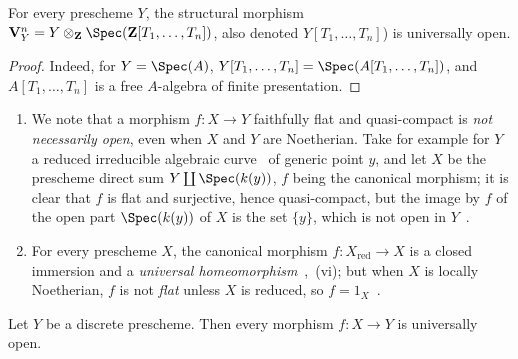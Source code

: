 \begin{corollary}[2.4.7]
\label{IV.2.4.7}
For every prescheme $Y$, the structural morphism $\mathbf{V}_Y^n=Y\otimes_\mathbf{Z}\Spec(\mathbf{Z}[T_1,\ldots,T_n])$, also denoted $Y[T_1,\ldots,T_n]$\textnormal{)} is universally open.
\end{corollary}

\begin{proof}
Indeed, for $Y=\Spec(A)$, $Y[T_1,\ldots,T_n]=\Spec(A[T_1,\ldots,T_n])$, and $A[T_1,\ldots,T_n]$ is a free $A$-algebra of finite presentation.
\end{proof}

\begin{remark}[2.4.8]
\label{IV.2.4.8}
\medskip\noindent
\begin{enumerate}[label=(\roman*)]
  \item We note that a morphism $f:X\to Y$ faithfully flat and quasi-compact is \emph{not necessarily open}, even when $X$ and $Y$ are Noetherian.
    Take for example for $Y$ a reduced irreducible algebraic curve~ of generic point $y$, and let $X$ be the prescheme direct sum $Y\coprod\Spec(k(y))$, $f$ being the canonical morphism; it is clear that $f$ is flat and surjective, hence quasi-compact, but the image by $f$ of the open part $\Spec(k(y))$ of $X$ is the set $\{y\}$, which is not open in $Y$~.
  \item For every prescheme $X$, the canonical morphism $f:X_{\mathrm{red}}\to X$ is a closed immersion and a \emph{universal homeomorphism}~,~(vi); but when $X$ is locally Noetherian, $f$ is not \emph{flat} unless $X$ is reduced, so $f=1_X$~.
\end{enumerate}
\end{remark}

\begin{proposition}[2.4.9]
\label{IV.2.4.9}
Let $Y$ be a discrete prescheme. Then every morphism $f:X\to Y$ is universally open.
\end{proposition}

